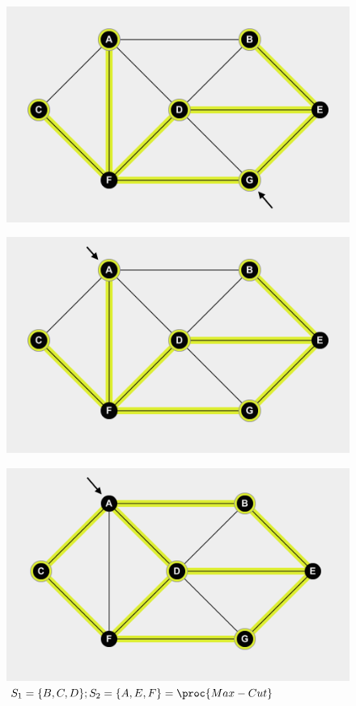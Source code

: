 \begin{homeworkProblem}
\begin{enumerate}[a)]
    \begin{figure}[ht]
\centering
\begin{minipage}{.5\textwidth}
  \centering
  \includegraphics[width=.4\linewidth]{q3-g2}
  \label{fig:test13}
\end{minipage}%
\begin{minipage}{.5\textwidth}
  \centering
  \includegraphics[width=.4\linewidth]{q3-a3}
  \label{fig:test14}
\end{minipage}
\end{figure}

	\begin{figure}[ht]
	\begin{center}

	\includegraphics[scale=0.2]{q3-a4}
	\caption{$S_1 = \{B, C, D\}; S_2 = \{A, E, F\} = \proc{Max-Cut}$}

	\end{center}
	\end{figure}
    


\end{enumerate}
\end{homeworkProblem}
